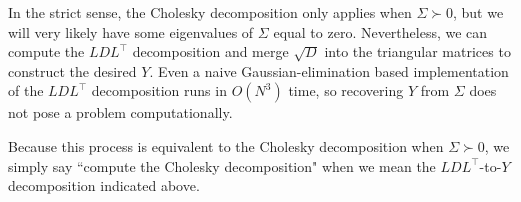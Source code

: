 In the strict sense, the Cholesky decomposition only applies when $\Sigma \succ 0$, but we will very likely have some eigenvalues of $\Sigma$ equal to zero. Nevertheless, we can compute the $LDL^\intercal$ decomposition and merge $\sqrt{D}$ into the triangular matrices to construct the desired $Y$. Even a naive Gaussian-elimination based implementation of the $LDL^\intercal$ decomposition runs in $O(N^3)$ time, so recovering $Y$ from $\Sigma$ does not pose a problem computationally.

Because this process is equivalent to the Cholesky decomposition when $\Sigma \succ 0$, we simply say ``compute the Cholesky decomposition" when we mean the $LDL^\intercal$-to-$Y$ decomposition indicated above.
